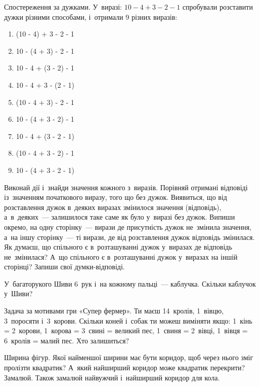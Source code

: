 \problem
Спостереження за дужками.
У~виразі: $10 - 4 + 3 - 2 - 1$ спробували розставити дужки різними способами,
і~отримали 9 різних виразів:
\begin{multicols}{2}
    \begin{enumerate}
        \item (10 - 4) + 3 - 2 - 1
        \item 10 - (4 + 3) - 2 - 1
        \item 10 - 4 + (3 - 2) - 1
        \item 10 - 4 + 3 - (2 - 1)
        \item (10 - 4 + 3) - 2 - 1
        \item 10 - (4 + 3 - 2) - 1
        \item 10 - 4 + (3 - 2 - 1)
        \item (10 - 4 + 3 - 2) - 1
        \item 10 - (4 + 3 - 2 - 1)
    \end{enumerate}
\end{multicols}
Виконай дії і~знайди значення кожного з~виразів.
Порівняй отримані відповіді із~значенням початкового виразу,
того що без дужок.
Виявиться, що від розставлення дужок в~деяких виразах змінилося
значення (відповідь), а~в~деяких~--- залишилося таке саме
як було у~виразі без дужок.
Випиши окремо, на одну сторінку~--- вирази де присутність дужок
не~змінила значення, а~на іншу сторінку~--- ті вирази,
де від розставлення дужок відповідь змінилася.
Як думаєш, що спільного є в~розташуванні дужок у~виразах
де відповідь не~змінилася?
А~що спільного є в~розташуванні дужок у~виразах на іншій сторінці?
Запиши свої думки-відповіді.


\problem
У~багаторукого Шиви 6~рук і~на кожному пальці~--- каблучка.
Скільки каблучок у~Шиви?


\problem
Задача за мотивами гри «Супер фермер».
Ти маєш 14~кролів, 1~вівцю, 3~поросяти і~3~корови.
Скільки коней і~собак ти можеш виміняти якщо:
1~кінь = 2~корови,
1~корова = 3~свині = великий пес,
1~свиня = 2~вівці,
1~вівця = 6~кролів = малий пес.
Хто залишиться?


\problem
Ширина фігур.
Якої найменшої ширини має бути коридор,
щоб через нього зміг пролізти квадратик?
А~який найширший коридор може квадратик перекрити?
Замалюй. Також замалюй найвужчий і~найширший коридор для кола.


